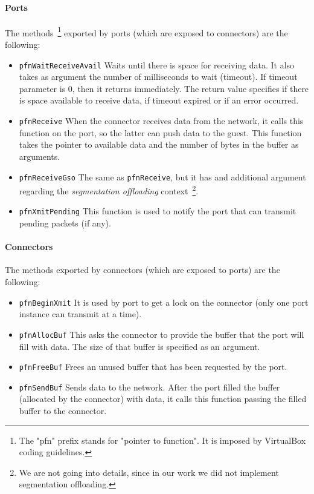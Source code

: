 \documentclass[a4paper, 12pt, titlepage]{report}
\begin{document}
\paragraph{Ports}
The methods~\footnote{The "pfn" prefix stands for "pointer to function". It is imposed by VirtualBox coding guidelines.} exported by ports (which are exposed to connectors) are the following:
\begin{itemize}
\item \texttt{pfnWaitReceiveAvail} Waits until there is space for receiving data. It also takes as argument the number of milliseconds to wait (timeout). If timeout parameter is 0, then it returns immediately. The return value specifies if there is space available to receive data, if timeout expired or if an error occurred.
\item \texttt{pfnReceive} When the connector receives data from the network, it calls this function on the port, so the latter can push data to the guest. This function takes the pointer to available data and the number of bytes in the buffer as arguments.
\item \texttt{pfnReceiveGso} The same as \texttt{pfnReceive}, but it has and additional argument regarding the \textit{segmentation offloading} context~\footnote{We are not going into details, since in our work we did not implement segmentation offloading.}.
\item \texttt{pfnXmitPending} This function is used to notify the port that can transmit pending packets (if any).
\end{itemize}
\paragraph{Connectors}
The methods exported by connectors (which are exposed to ports) are the following:
\begin{itemize}
\item \texttt{pfnBeginXmit} It is used by port to get a lock on the connector (only one port instance can transmit at a time).
\item \texttt{pfnAllocBuf} This asks the connector to provide the buffer that the port will fill with data. The size of that buffer is specified as an argument.
\item \texttt{pfnFreeBuf} Frees an unused buffer that has been requested by the port.
\item \texttt{pfnSendBuf} Sends data to the network. After the port filled the buffer (allocated by the connector) with data, it calls this function passing the filled buffer to the connector.
\end{itemize}
\end{document}

